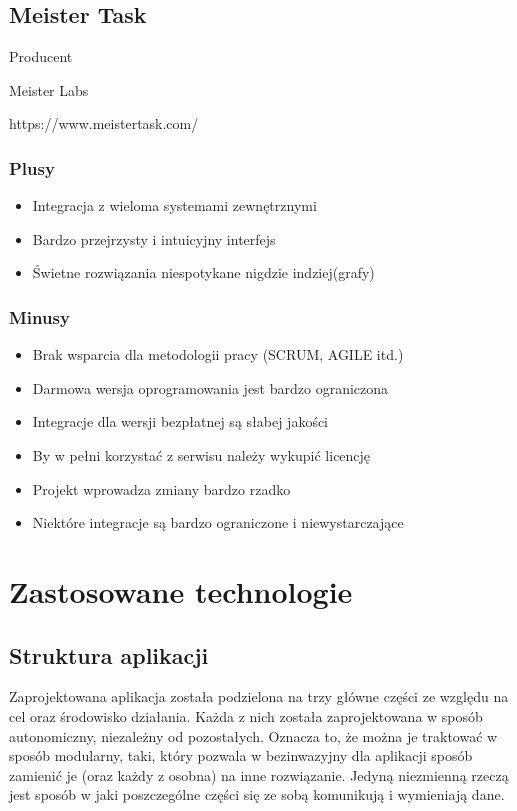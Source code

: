 \documentclass[eng,printmode]{mgr}
\begin{document}
\subsection{Meister Task}
\begin{labeling}{Producent}
\item [Producent:] Meister Labs
\item [Link:] https://www.meistertask.com/
\end{labeling}
\subsubsection{Plusy}
\begin{itemize}
  \item[--] Integracja z wieloma systemami zewnętrznymi
  \item[--] Bardzo przejrzysty i intuicyjny interfejs
  \item[--] Świetne rozwiązania niespotykane nigdzie indziej(grafy)
\end{itemize}
\subsubsection{Minusy}
\begin{itemize}
  \item[--] Brak wsparcia dla metodologii pracy (SCRUM, AGILE itd.)
  \item[--] Darmowa wersja oprogramowania jest bardzo ograniczona
  \item[--] Integracje dla wersji bezpłatnej są słabej jakości
  \item[--] By w pełni korzystać z serwisu należy wykupić licencję
  \item[--] Projekt wprowadza zmiany bardzo rzadko
  \item[--] Niektóre integracje są bardzo ograniczone i niewystarczające
\end{itemize}

\section{Zastosowane technologie}
\subsection{Struktura aplikacji}
Zaprojektowana aplikacja została podzielona na trzy główne części ze względu na cel oraz środowisko działania. Każda z nich została zaprojektowana w sposób autonomiczny, niezależny od pozostałych. Oznacza to, że można je traktować w sposób modularny, taki, który pozwala w bezinwazyjny dla aplikacji sposób zamienić je (oraz każdy z osobna) na inne rozwiązanie. Jedyną niezmienną rzeczą jest sposób w jaki poszczególne części się ze sobą komunikują i wymieniają dane. 
\end{document}
